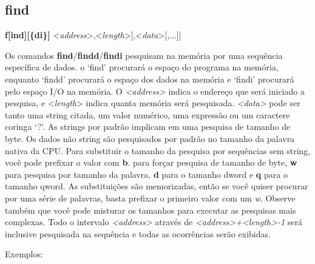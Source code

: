 \documentclass[letterpaper,10pt,brazil]{sphinxmanual}
\begin{document}
\begin{quote}
\label{debugger/memory:debugger-command-find}\end{quote}


\subsection{find}
\label{debugger/memory:find}\label{debugger/memory:debugger-command-find}
\begin{DUlineblock}{0em}
\item[]
\begin{DUlineblock}{\DUlineblockindent}
\item[] \textbf{f{[}ind{]}{[}\{d\textbar{}i\}{]}} \textless{}\emph{address}\textgreater{},\textless{}\emph{length}\textgreater{}{[},\textless{}\emph{data}\textgreater{}{[},...{]}{]}
\item[] 
\end{DUlineblock}
\item[] Os comandos \textbf{find}/\textbf{findd}/\textbf{findi} pesquisam na memória por uma sequência específica de dados. o `find' procurará o espaço do programa na memória, enquanto `findd' procurará o espaço dos dados na memória e `findi' procurará pelo espaço I/O na memória. O \emph{\textless{}address\textgreater{}} indica o endereço que será iniciado a pesquisa, e \textless{}\emph{length}\textgreater{} indica quanta memória será pesquisada. \emph{\textless{}data\textgreater{}} pode ser tanto uma string citada, um valor numérico, uma expressão ou um caractere coringa `?'. As strings por padrão implicam em uma pesquisa de tamanho de byte. Os dados não string são pesquisados por padrão no tamanho da palavra nativa da CPU. Para substituir o tamanho da pesquisa por sequências sem string, você pode prefixar o valor com \textbf{b}. para forçar pesquisa de tamanho de byte, \textbf{w} para pesquisa por tamanho da palavra, \textbf{d} para o tamanho dword e \textbf{q} para o tamanho qword. As substituições são memorizadas, então se você quiser procurar por uma série de palavras, basta prefixar o primeiro valor com um \emph{w}. Observe também que você pode misturar os tamanhos para executar as pesquisas mais complexas. Todo o intervalo \emph{\textless{}address\textgreater{}} através de \emph{\textless{}address\textgreater{}+\textless{}length\textgreater{}-1} será inclusive pesquisada na sequência e todas as ocorrências serão exibidas.
\item[] 
\item[] Exemplos:
\item[] 

\end{DUlineblock}
\end{document}
